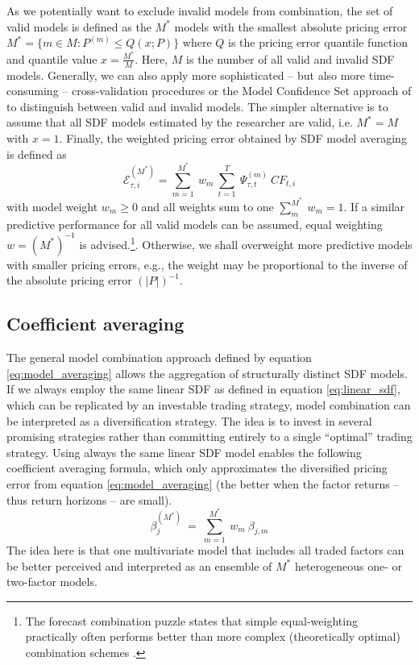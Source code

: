 \documentclass[12pt]{article}
\begin{document}
As we potentially want to exclude invalid models from combination, the set of valid models is defined as the $M^*$ models with the smallest absolute pricing error $M^*=\{m \in M: P^{(m)} \leq Q(x;P) \}$ where $Q$ is the pricing error quantile function and quantile value $x = \frac{M^*}{M}$.
Here, $M$ is the number of all valid and invalid SDF models.
Generally, we can also apply more sophisticated -- but also more time-consuming -- cross-validation procedures \citep{AC10} or the Model Confidence Set approach of \cite{HLN11} to distinguish between valid and invalid models.
The simpler alternative is to assume that all SDF models estimated by the researcher are valid, i.e. $M^*=M$ with $x=1$.
Finally, the weighted pricing error obtained by SDF model averaging is defined as
\begin{equation}
\label{eq:model_averaging}
\mathcal{E}_{\tau, i}^{(M^*)} = 
\sum_{m=1}^{M^*} \  
w_m \
\sum_{t=1}^{T} \
\Psi_{\tau,t}^{(m)}\ 
{CF}_{t, i}
\end{equation}
with model weight $w_m \geq 0$ and all weights sum to one $\sum_m^{M^*}\ w_m=1$. 
If a similar predictive performance for all valid models can be assumed, equal weighting $w=(M^*)^{-1}$ is advised.\footnote{The forecast combination puzzle states that simple equal-weighting practically often performs better than more complex (theoretically optimal) combination schemes \citep{SW09,CMVW16,QRCY19}.}.
Otherwise, we shall overweight more predictive models with smaller pricing errors, e.g., the weight may be proportional to the inverse of the absolute pricing error $\left(\left|P\right|\right)^{-1}$.

\subsection{Coefficient averaging}
\label{sec:coef_averaging}

The general model combination approach defined by equation \ref{eq:model_averaging} allows the aggregation of structurally distinct SDF models.
If we always employ the same linear SDF as defined in equation \ref{eq:linear_sdf}, which can be replicated by an investable trading strategy, model combination can be interpreted as a diversification strategy.
The idea is to invest in several promising strategies rather than committing entirely to a single ``optimal'' trading strategy.
Using always the same linear SDF model enables the following coefficient averaging formula, which only approximates the diversified pricing error from equation \ref{eq:model_averaging} (the better when the factor returns -- thus return horizons -- are small).
\begin{equation}
\label{eq:coef_averaging}
\beta_j^{(M^*)}\ =\ \sum_{m=1}^{M^*}\ w_m \ \beta_{j,m}
\end{equation}
The idea here is that one multivariate model that includes all traded factors can be better perceived and interpreted as an ensemble of $M^*$ heterogeneous one- or two-factor models.
\end{document}
